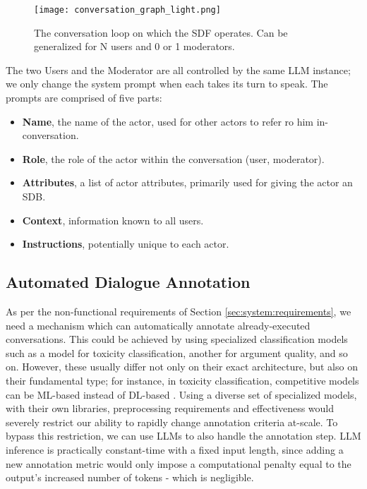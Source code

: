\begin{figure}
	\centering
	\texttt{[image: conversation\_graph\_light.png]}
	\caption{The conversation loop on which the SDF operates. Can be generalized for N users and 0 or 1 moderators.}
	\label{fig::conversation}
\end{figure}

The two Users and the Moderator are all controlled by the same LLM instance; we only change the system prompt when each takes its turn to speak. The prompts are comprised of five parts:

\begin{itemize}
	\item \textbf{Name}, the name of the actor, used for other actors to refer ro him in-conversation.
	\item \textbf{Role}, the role of the actor within the conversation (user, moderator).
	\item \textbf{Attributes}, a list of actor attributes, primarily used for giving the actor an SDB.
	\item \textbf{Context}, information known to all users.
	\item \textbf{Instructions}, potentially unique to each actor. 
\end{itemize}


\subsection{Automated Dialogue Annotation}
\label{ssec:system:annotation}

As per the non-functional requirements of Section \ref{sec:system:requirements}, we need a mechanism which can automatically annotate already-executed conversations. This could be achieved by using specialized classification models such as a model for toxicity classification, another for argument quality, and so on. However, these usually differ not only on their exact architecture, but also on their fundamental type; for instance, in toxicity classification, competitive models can be ML-based instead of DL-based \cite{anjum2024hate}. Using a diverse set of specialized models, with their own libraries, preprocessing requirements and effectiveness would severely restrict our ability to rapidly change annotation criteria at-scale. To bypass this restriction, we can use LLMs to also handle the annotation step. LLM inference is practically constant-time with a fixed input length, since adding a new annotation metric would only impose a computational penalty equal to the output's increased number of tokens - which is negligible. 

